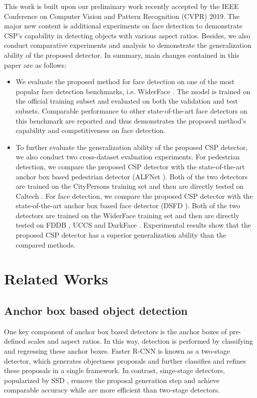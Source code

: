 This work is built upon our preliminary work recently accepted by the IEEE Conference on Computer Vision and Pattern Recognition (CVPR) 2019. The major new content is additional experiments on face detection to demonstrate CSP's capability in detecting objects with various aspect ratios. Besides, we also conduct comparative experiments and analysis to demonstrate the generalization ability of the proposed detector. In summary, main changes contained in this paper are as follows:
\begin{itemize}
\item  We evaluate the proposed method for face detection on one of the most popular face detection benchmarks, i.e. WiderFace \cite{yang2016wider}. The model is trained on the official training subset and evaluated on both the validation and test subsets. Comparable performance to other state-of-the-art face detectors on this benchmark are reported and thus demonstrates the proposed method's capability and competitiveness on face detection.
\item  To further evaluate the generalization ability of the proposed CSP detector, we also conduct two cross-dataset evaluation experiments. For pedestrian detection, we compare the proposed CSP detector with the state-of-the-art anchor box based pedestrian detector (ALFNet \cite{Liu_2018_ECCV}). Both of the two detectors are trained on the CityPersons \cite{zhang2017citypersons} training set and then are directly tested on Caltech \cite{dollar2012pedestrian}.
    For face detection, we compare the proposed CSP detector with the state-of-the-art anchor box based face detector (DSFD \cite{li2018dsfd}). Both of the two detectors are trained on the WiderFace \cite{yang2016wider} training set and then are directly tested on FDDB \cite{fddbTech}, UCCS \cite{uccs} and DarkFace \cite{wei2018deep}. Experimental results show that the proposed CSP detector has a superior generalization ability than the compared methods.
\end{itemize}

\section{Related Works}
\subsection{Anchor box based object detection}
One key component of anchor box based detectors is the anchor boxes of pre-defined scales and aspect ratios. In this way, detection is performed by classifying and regressing these anchor boxes. Faster R-CNN \cite{ren2015faster} is known as a two-stage detector, which generates objectness proposals and further classifies and refines these proposals in a single framework. In contrast, singe-stage detectors, popularized by SSD \cite{liu2016ssd}, remove the proposal generation step and achieve comparable accuracy while are more efficient than two-stage detectors.

